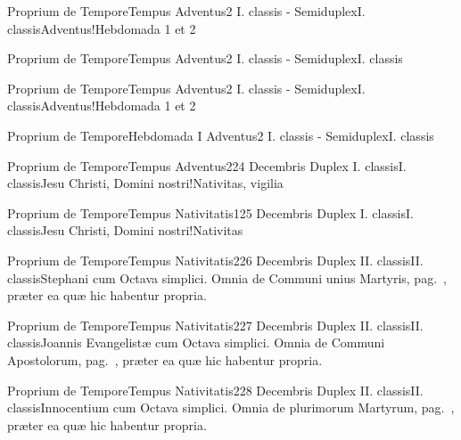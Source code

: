 \documentclass[nocturnale-romanum.tex]{subfiles}
\begin{document}

	{Proprium de Tempore}{Tempus Adventus}{2}{}
	{I. classis - Semiduplex}{I. classis}{Adventus!Hebdomada 1 et 2}
	{}
	{}

	{Proprium de Tempore}{Tempus Adventus}{2}{}
	{I. classis - Semiduplex}{I. classis}{}
	{}
	{}

	{Proprium de Tempore}{Tempus Adventus}{2}{}
	{I. classis - Semiduplex}{I. classis}{Adventus!Hebdomada 1 et 2}
	{}
	{}

	{Proprium de Tempore}{Hebdomada I Adventus}{2}{}
	{I. classis - Semiduplex}{I. classis}{}
	{}
	{}

	{Proprium de Tempore}{Tempus Adventus}{2}{24 Decembris}
	{Duplex I. classis}{I. classis}{Jesu Christi, Domini nostri!Nativitas, vigilia}
	{}
	{}


	{Proprium de Tempore}{Tempus Nativitatis}{1}{25 Decembris}
	{Duplex I. classis}{I. classis}{Jesu Christi, Domini nostri!Nativitas}
	{}
	{}

	{Proprium de Tempore}{Tempus Nativitatis}{2}{26 Decembris}
	{Duplex II. classis}{II. classis}{Stephani}
	{cum Octava simplici. Omnia de Communi unius Martyris, pag.\ \pageref{M-UMEX}, præter ea quæ hic habentur propria.}
	{}

	{Proprium de Tempore}{Tempus Nativitatis}{2}{27 Decembris}
	{Duplex II. classis}{II. classis}{Joannis Evangelistæ}
	{cum Octava simplici. Omnia de Communi Apostolorum, pag.\ \pageref{M-APEX}, præter ea quæ hic habentur propria.}
	{}

	{Proprium de Tempore}{Tempus Nativitatis}{2}{28 Decembris}
	{Duplex II. classis}{II. classis}{Innocentium}
	{cum Octava simplici. Omnia de plurimorum Martyrum, pag.\ \pageref{M-PMEX}, præter ea quæ hic habentur propria.}
	{}
\end{document}

